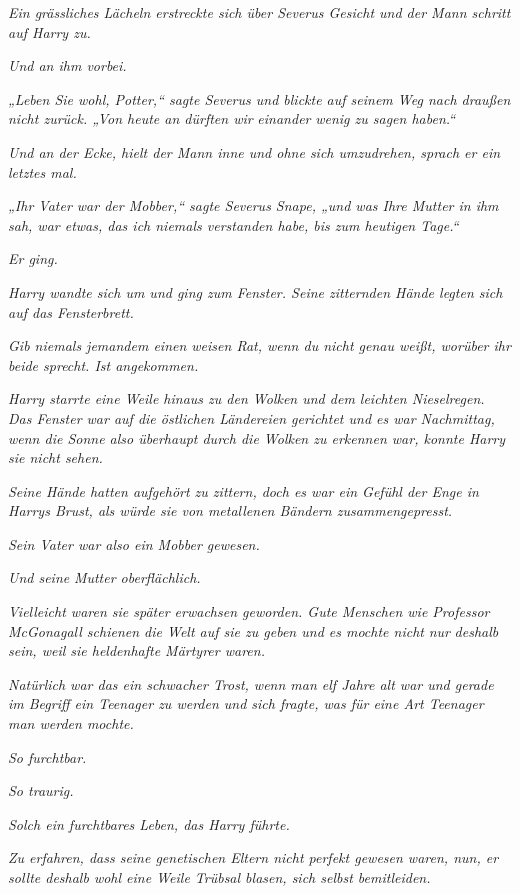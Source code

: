 {\emph{Ein grässliches Lächeln erstreckte sich über Severus Gesicht und der Mann schritt auf Harry zu.}

\emph{Und an ihm vorbei.}

\emph{„Leben Sie wohl, Potter,“ sagte Severus und blickte auf seinem Weg nach draußen nicht zurück. „Von heute an dürften wir} \emph{einander} \emph{wenig zu sagen haben.“}

\emph{Und an der Ecke, hielt der Mann inne und ohne sich umzudrehen, sprach er ein letztes mal.}

\emph{„Ihr Vater war der Mobber,“ sagte Severus Snape, „und was Ihre Mutter in ihm sah, war etwas, das ich niemals verstanden habe, bis zum heutigen Tage.“}

\emph{Er ging.}

\emph{Harry wandte sich um und ging zum Fenster. Seine zitternden Hände legten sich auf das Fensterbrett.}

\emph{\emph{Gib niemals jemandem einen weisen Rat, wenn du nicht genau weißt, worüber ihr beide sprecht. Ist angekommen.}}

\emph{Harry starrte eine Weile hinaus zu den Wolken und dem leichten Nieselregen. Das Fenster war auf die östlichen Ländereien gerichtet und es war Nachmittag, wenn die Sonne also überhaupt durch die Wolken zu erkennen war, konnte Harry sie nicht sehen.}

\emph{Seine Hände hatten aufgehört zu zittern, doch es war ein Gefühl der Enge in Harrys Brust, als würde sie von metallenen Bändern zusammengepresst.}

\emph{Sein Vater war also ein Mobber gewesen.}

\emph{Und seine} \emph{Mutter oberflächlich.}

\emph{Vielleicht waren sie später erwachsen geworden. Gute Menschen wie Professor McGonagall schienen die Welt auf sie zu geben und es mochte nicht} \emph{\emph{nur}} \emph{deshalb sein, weil sie heldenhafte Märtyrer waren.}

\emph{Natürlich war das ein schwacher Trost, wenn man elf Jahre alt war und gerade im Begriff ein Teenager zu werden und sich fragte, was für eine Art Teenager man werden mochte.}

\emph{So furchtbar.}

\emph{So traurig.}

\emph{Solch ein furchtbares Leben, das Harry führte.}

\emph{Zu erfahren, dass seine genetischen Eltern nicht perfekt gewesen waren, nun, er sollte deshalb wohl eine Weile Trübsal blasen, sich selbst bemitleiden.}

}
